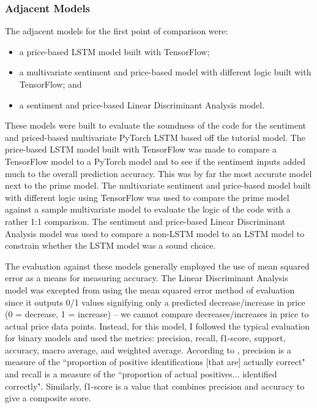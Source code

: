 \documentclass[10pt,twocolumn]{article}
\begin{document}
\subsubsection{Adjacent Models}

The adjacent models for the first point of comparison were:

\begin{itemize}
    \item a price-based LSTM model built with TensorFlow;
    \item a multivariate sentiment and price-based model with different logic built with TensorFlow; and
    \item a sentiment and price-based Linear Discriminant Analysis model.
\end{itemize}

\noindent These models were built to evaluate the soundness of the code for the sentiment and priced-based multivariate PyTorch LSTM based off the tutorial model. The price-based LSTM model built with TensorFlow was made to compare a TensorFlow model to a PyTorch model and to see if the sentiment inputs added much to the overall prediction accuracy. This was by far the most accurate model next to the prime model. The multivariate sentiment and price-based model built with different logic using TensorFlow was used to compare the prime model against a sample multivariate model to evaluate the logic of the code with a rather 1:1 comparison. The sentiment and price-based Linear Discriminant Analysis model was used to compare a non-LSTM model to an LSTM model to constrain whether the LSTM model was a sound choice.

The evaluation against these models generally employed the use of mean squared error as a means for measuring accuracy. The Linear Discriminant Analysis model was excepted from using the mean squared error method of evaluation since it outputs 0/1 values signifying only a predicted decrease/increase in price (0 = decrease, 1 = increase) -- we cannot compare decreases/increases in price to actual price data points. Instead, for this model, I followed the typical evaluation for binary models and used the metrics: precision, recall, f1-score, support, accuracy, macro average, and weighted average. According to \textcite{precisionandrecall}, precision is a measure of the ``proportion of positive identifications [that are] actually correct" and recall is a measure of the ``proportion of actual positives... identified correctly". Similarly, f1-score is a value that combines precision and accuracy to give a composite score.
\end{document}
